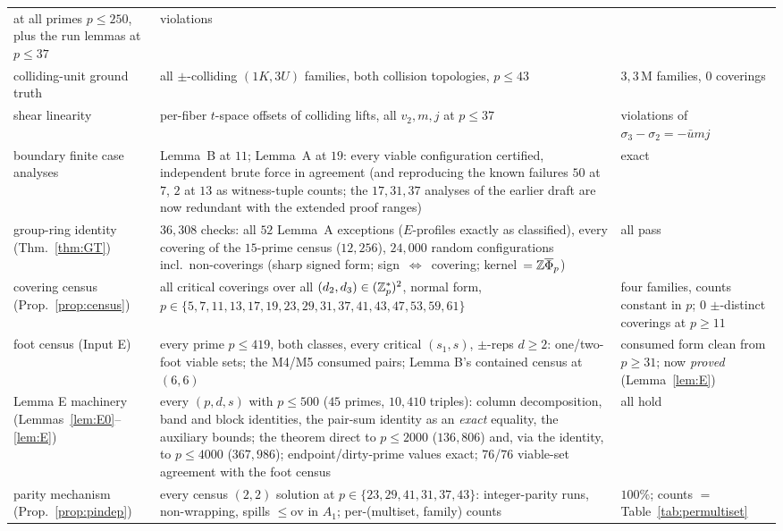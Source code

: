 \begin{longtable}{@{}p{3.7cm}>{\raggedright\arraybackslash}p{8.2cm}>{\raggedright\arraybackslash}p{3.1cm}@{}}
  at all primes $p\le250$, plus the run lemmas at $p\le37$ & 0 violations \\
colliding-unit ground truth & all $\pm$-colliding $(1K,3U)$ families,
  both collision topologies, $p\le43$ & $3{,}3$\,M families, 0 coverings \\
shear linearity & per-fiber $t$-space offsets of colliding lifts,
  all $v_2,m,j$ at $p\le37$ & 0 violations of $\sigma_3-\sigma_2=-\bar u mj$ \\
boundary finite case analyses & Lemma~B at $11$; Lemma~A at $19$: every
  viable configuration certified, independent brute force in
  agreement (and reproducing the known failures $50$ at $7$, $2$ at $13$
  as witness-tuple counts; the $17,31,37$ analyses of the earlier draft
  are now redundant with the extended proof ranges) & exact \\
group-ring identity (Thm.~\ref{thm:GT}) & $36{,}308$ checks: all $52$
  Lemma~A exceptions ($E$-profiles exactly as classified), every covering
  of the $15$-prime census ($12{,}256$), $24{,}000$ random configurations
  incl.\ non-coverings (sharp signed form; sign~$\Leftrightarrow$~covering;
  kernel~$=\mathbb{Z}\overline\Phi_p$) & all pass \\
covering census (Prop.~\ref{prop:census}) & all critical coverings over
  all $(d_2,d_3)\in(\mathbb{Z}_p^*)^2$, normal form, $p\in\{5,7,11,13,17,19,23,29,31,37,41,43,47,53,59,61\}$
  & four families, counts constant in $p$; $0$ $\pm$-distinct coverings at
  $p\ge11$ \\
foot census (Input E) & every prime $p\le419$, both classes, every
  critical $(s_1,s)$, $\pm$-reps $d\ge2$: one/two-foot viable sets;
  the M4/M5 consumed pairs; Lemma B's contained census at $(6,6)$ &
  consumed form clean from $p\ge31$; now \emph{proved}
  (Lemma~\ref{lem:E}) \\
Lemma E machinery (Lemmas~\ref{lem:E0}--\ref{lem:E}) & every $(p,d,s)$
  with $p\le500$ ($45$ primes, $10{,}410$ triples): column decomposition,
  band and block identities, the pair-sum identity as an \emph{exact}
  equality, the auxiliary bounds; the theorem direct to $p\le2000$
  ($136{,}806$) and, via the identity, to $p\le4000$ ($367{,}986$);
  endpoint/dirty-prime values exact; $76$/$76$ viable-set agreement with
  the foot census & all hold \\
parity mechanism (Prop.~\ref{prop:pindep}) & every census $(2,2)$ solution
  at $p\in\{23,29,41,31,37,43\}$: integer-parity runs, non-wrapping,
  spills $\le\mathrm{ov}$ in $A_1$; per-(multiset, family) counts &
  $100\%$; counts $=$ Table~\ref{tab:permultiset} \\

\end{longtable}
